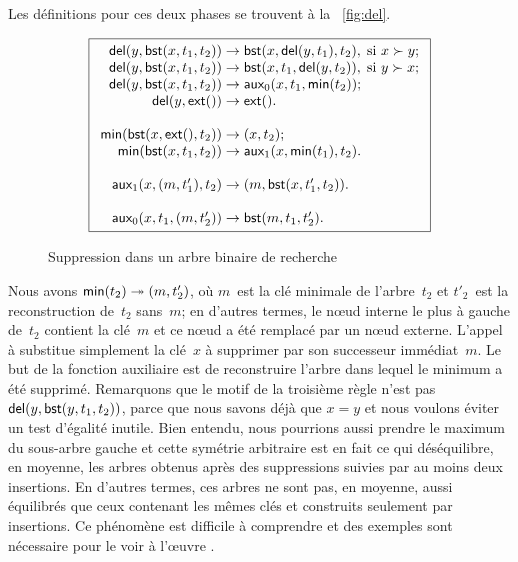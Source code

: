 Les définitions pour ces deux phases se trouvent à la
\fig~\vref{fig:del}.
\begin{figure}[!b]
\begin{equation*}
\boxed{
\begin{array}{r@{\;}l@{\;}l}
  \fun{del}(y,\fun{bst}(x,t_1,t_2)) & \rightarrow &
  \fun{bst}(x,\fun{del}(y,t_1),t_2),\; \text{si \(x \succ y\)};\\
\fun{del}(y,\fun{bst}(x,t_1,t_2)) & \rightarrow &
  \fun{bst}(x,t_1,\fun{del}(y,t_2)),\; \text{si \(y \succ x\)};\\
\fun{del}(y,\fun{bst}(x,t_1,t_2)) & \rightarrow &
   \fun{aux}_0(x,t_1,\fun{min}(t_2));\\
\fun{del}(y,\fun{ext}()) & \rightarrow & \fun{ext}().\\
\\
\fun{min}(\fun{bst}(x,\fun{ext}(),t_2)) & \rightarrow & \pair{x}{t_2};\\
\fun{min}(\fun{bst}(x,t_1,t_2)) & \rightarrow &
  \fun{aux}_1(x,\fun{min}(t_1),t_2).\\
\\
\fun{aux}_1(x,\pair{m}{t'_1},t_2) & \rightarrow &
  \pair{m}{\fun{bst}(x,t'_1,t_2)}.\\
\\
\fun{aux}_0(x,t_1,\pair{m}{t'_2}) & \rightarrow & \fun{bst}(m,t_1,t'_2).
\end{array}}
\end{equation*}
\caption{Suppression dans un arbre binaire de recherche}
\label{fig:del}
\end{figure}
Nous avons \(\textsf{min}(t_2) \twoheadrightarrow
({m},{t'_2})\), où \(m\)~est la clé minimale
de l'arbre~\(t_2\) et \(t'_2\)~est la reconstruction de~\(t_2\)
sans~\(m\); en d'autres termes, le nœud interne le plus à gauche
de~\(t_2\) contient la clé~\(m\) et ce nœud a été remplacé par un nœud
externe. L'appel à  substitue simplement la clé~\(x\)
à supprimer par son successeur immédiat~\(m\). Le but de la fonction
auxiliaire  est de reconstruire l'arbre dans lequel
le minimum a été supprimé. Remarquons que le motif de la troisième
règle n'est pas \(\textsf{del}(y,
\textsf{bst}(y,t_1,t_2))\), parce que nous savons
déjà que \(x=y\) et nous voulons éviter un test d'égalité
inutile. Bien entendu, nous pourrions aussi prendre le maximum du
sous-arbre gauche et cette symétrie arbitraire est en fait ce qui
déséquilibre, en moyenne, les arbres obtenus après des suppressions
suivies par au moins deux insertions. En d'autres termes, ces arbres
ne sont pas, en moyenne, aussi équilibrés que ceux contenant les mêmes
clés et construits seulement par insertions. Ce phénomène est
difficile à comprendre et des exemples sont nécessaire pour le voir à
l'œuvre
\citep{Eppinger_1983,CulbersonMunro_1989,CulbersonEvans_1994,Knuth_1998a,Heyer_2009}.

